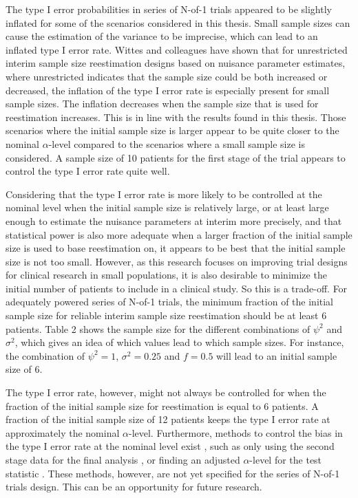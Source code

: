 \documentclass[AMA,STIX1COL,]{WileyNJD-v2}
\begin{document}
The type I error probabilities in series of N-of-1 trials appeared to be slightly inflated for some of the scenarios considered in this thesis. Small sample sizes can cause the estimation of the variance to be imprecise, which can lead to an inflated type I error rate. Wittes and colleagues \citep{wittes1999} have shown that for unrestricted interim sample size reestimation designs based on nuisance parameter estimates, where unrestricted indicates that the sample size could be both increased or decreased, the inflation of the type I error rate is especially present for small sample sizes. The inflation decreases when the sample size that is used for reestimation increases. This is in line with the results found in this thesis. Those scenarios where the initial sample size is larger appear to be quite closer to the nominal \(\alpha\)-level compared to the scenarios where a small sample size is considered. A sample size of 10 patients for the first stage of the trial appears to control the type I error rate quite well.

Considering that the type I error rate is more likely to be controlled at the nominal level when the initial sample size is relatively large, or at least large enough to estimate the nuisance parameters at interim more precisely, and that statistical power is also more adequate when a larger fraction of the initial sample size is used to base reestimation on, it appears to be best that the initial sample size is not too small. However, as this research focuses on improving trial designs for clinical research in small populations, it is also desirable to minimize the initial number of patients to include in a clinical study. So this is a trade-off. For adequately powered series of N-of-1 trials, the minimum fraction of the initial sample size for reliable interim sample size reestimation should be at least 6 patients. Table 2 shows the sample size for the different combinations of \(\psi^2\) and \(\sigma^2\), which gives an idea of which values lead to which sample sizes. For instance, the combination of \(\psi^2 = 1\), \(\sigma^2 = 0.25\) and \(f = 0.5\) will lead to an initial sample size of 6.

The type I error rate, however, might not always be controlled for when the fraction of the initial sample size for reestimation is equal to 6 patients. A fraction of the initial sample size of 12 patients keeps the type I error rate at approximately the nominal \(\alpha\)-level. Furthermore, methods to control the bias in the type I error rate at the nominal level exist \citep{proschan2005}, such as only using the second stage data for the final analysis \citep{stein1945}, or finding an adjusted \(\alpha\)-level for the test statistic \citep{kieser2000}. These methods, however, are not yet specified for the series of N-of-1 trials design. This can be an opportunity for future research.
\end{document}
